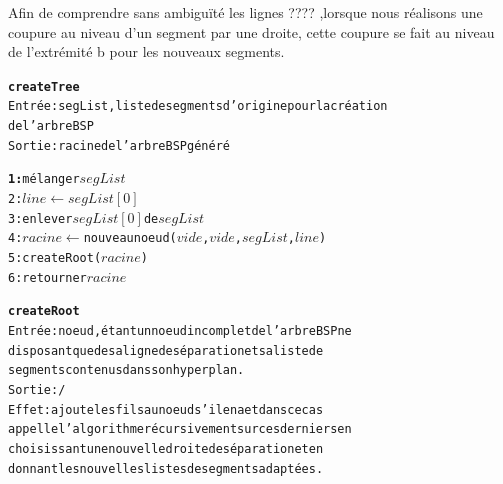 \documentclass[11pt,a4paper]{article}
\begin{document}
Afin de comprendre sans ambiguïté les lignes ???? ,lorsque nous réalisons une coupure au niveau d'un segment par une droite, cette coupure se fait au niveau de l'extrémité b pour les nouveaux segments. 

\begin{alltt}
\textbf{createTree}
Entrée : segList, liste de segments d'origine pour la création 
de l'arbre BSP
Sortie : racine de l'arbre BSP généré

\textbf{1:} mélanger \(segList\)
2: \(line \leftarrow segList[0]\)
3: enlever \(segList[0]\) de \(segList\)
4: \(racine\) \(\leftarrow\) nouveau noeud (\(vide\), \(vide\), \(segList\), \(line\))
5: createRoot(\(racine\))
6: retourner \(racine\)
\end{alltt} 

\begin{alltt}
\textbf{createRoot}
Entrée : noeud, étant un noeud incomplet de l'arbre BSP ne
disposant que de sa ligne de séparation et sa liste de
segments contenus dans son hyperplan.
Sortie : /
Effet : ajoute les fils au noeud s'il en a et dans ce cas 
appelle l'algorithme récursivement sur ces derniers en 
choisissant une nouvelle droite de séparation et en 
donnant les nouvelles listes de segments adaptées.


\end{alltt}
\end{document}
